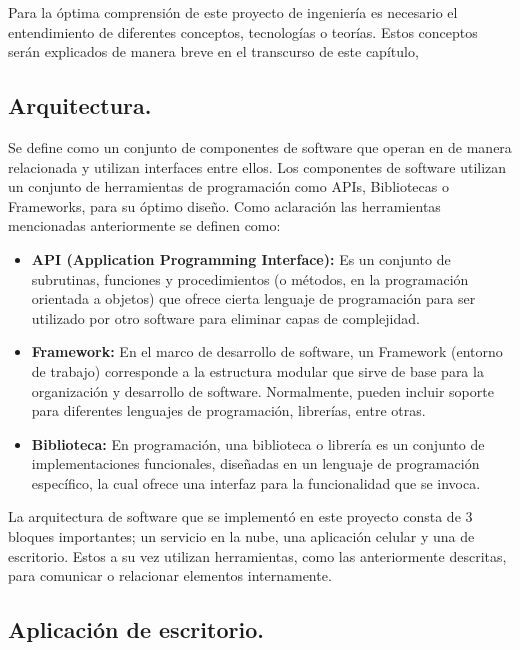 
Para la óptima comprensión de este proyecto de ingeniería es necesario el entendimiento de diferentes conceptos, tecnologías o teorías. Estos conceptos serán explicados de manera breve en el transcurso de este capítulo, 

\subsection{Arquitectura.}
Se define como un conjunto de componentes de software que operan en de manera relacionada y utilizan interfaces entre ellos. Los componentes de software utilizan un conjunto de herramientas de programación como APIs, Bibliotecas o Frameworks, para su óptimo diseño. Como aclaración las herramientas mencionadas anteriormente se definen como: 
\begin{itemize}
	\item \textbf{API (Application Programming Interface):} Es un conjunto de subrutinas, funciones y procedimientos (o métodos, en la programación orientada a objetos) que ofrece cierta lenguaje de programación para ser utilizado por otro software para eliminar capas de complejidad.
	
	\item \textbf{Framework:} En el marco de desarrollo de software, un Framework (entorno de trabajo) corresponde a la estructura  modular que sirve de base para la organización y desarrollo de software. Normalmente, pueden incluir soporte para diferentes lenguajes de programación, librerías, entre otras. 
	\item \textbf{Biblioteca:} En programación, una biblioteca o librería es un conjunto de implementaciones funcionales, diseñadas en un lenguaje de programación específico, la cual ofrece una interfaz para la funcionalidad que se invoca.
\end{itemize}

La arquitectura de software que se implementó en este proyecto consta de 3 bloques importantes; un servicio en la nube, una aplicación celular y una de escritorio. Estos a su vez utilizan herramientas, como las anteriormente descritas, para comunicar o relacionar elementos internamente.

\subsection{Aplicación de escritorio.} 

